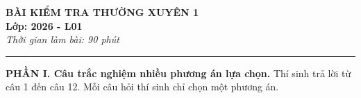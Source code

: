 \documentclass[12pt]{article}
\begin{document}
	
	\begin{center}
		{\Large \textbf{BÀI KIỂM TRA THƯỜNG XUYÊN 1}} \\[6pt]
		{\large \textbf{Lớp: 2026 - L01}} \\[6pt]
		\textit{Thời gian làm bài: 90 phút}
	\end{center}
	\vspace{3mm}
	\hrule
	\vspace{6mm}
	
	\noindent\textbf{PHẦN I. Câu trắc nghiệm nhiều phương án lựa chọn.} Thí sinh trả lời từ câu 1 đến câu 12. Mỗi câu hỏi thí sinh chỉ chọn một phương án.
	\vspace{3mm}
	
\end{document}

